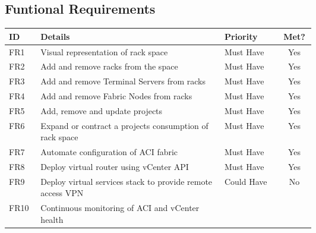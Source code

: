 \subsection{Funtional Requirements}
\begin{center}
    \begin{table}[H]
        \begin{tabular}{l p{0.6\linewidth} l c}
            \hline
            \textbf{ID} & \textbf{Details}
                        & \textbf{Priority}
                        & \textbf{Met?}
            \\ \hline
            FR1         & Visual representation of rack space
                        & Must Have
                        & \cellcolor{green!25}Yes
            \\ \hline
            FR2         & Add and remove racks from the space
                        & Must Have
                        & \cellcolor{green!25}Yes
            \\ \hline
            FR3         & Add and remove Terminal Servers from racks
                        & Must Have
                        & \cellcolor{green!25}Yes
            \\ \hline
            FR4         & Add and remove Fabric Nodes from racks
                        & Must Have
                        & \cellcolor{green!25}Yes
            \\ \hline
            FR5         & Add, remove and update projects
                        & Must Have
                        & \cellcolor{green!25}Yes
            \\ \hline
            FR6         & Expand or contract a projects consumption of rack
            space       & Must Have
                        & \cellcolor{green!25}Yes
            \\ \hline
            FR7         & Automate configuration of ACI fabric
                        & Must Have
                        & \cellcolor{green!25}Yes
            \\ \hline
            FR8         & Deploy virtual router using vCenter API
                        & Must Have
                        & \cellcolor{green!25}Yes
            \\ \hline
            FR9         & Deploy virtual services stack to provide remote
            access VPN  & Could
            Have
                        & \cellcolor{red!25}No
            \\ \hline
            FR10        & Continuous monitoring of ACI and vCenter health

\end{tabular}
\end{table}
\end{center}
